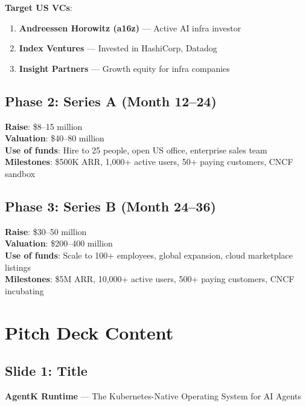 \documentclass[12pt,a4paper,openany]{report}
\begin{document}
\textbf{Target US VCs}:
\begin{enumerate}
    \item \textbf{Andreessen Horowitz (a16z)} — Active AI infra investor
    \item \textbf{Index Ventures} — Invested in HashiCorp, Datadog
    \item \textbf{Insight Partners} — Growth equity for infra companies
\end{enumerate}

\section{Phase 2: Series A (Month 12--24)}

\begin{moneybox}
\textbf{Raise}: \$8--15 million\\
\textbf{Valuation}: \$40--80 million\\
\textbf{Use of funds}: Hire to 25 people, open US office, enterprise sales team\\
\textbf{Milestones}: \$500K ARR, 1,000+ active users, 50+ paying customers, CNCF sandbox
\end{moneybox}

\section{Phase 3: Series B (Month 24--36)}

\begin{moneybox}
\textbf{Raise}: \$30--50 million\\
\textbf{Valuation}: \$200--400 million\\
\textbf{Use of funds}: Scale to 100+ employees, global expansion, cloud marketplace listings\\
\textbf{Milestones}: \$5M ARR, 10,000+ active users, 500+ paying customers, CNCF incubating
\end{moneybox}


\chapter{Pitch Deck Content}

\section{Slide 1: Title}
\textbf{AgentK Runtime} — The Kubernetes-Native Operating System for AI Agents
\end{document}
